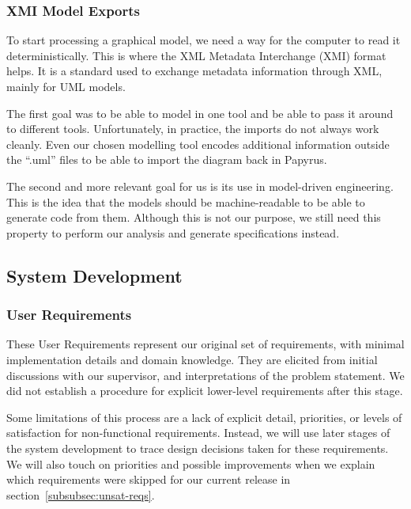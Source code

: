\subsubsection{XMI Model Exports}
To start processing a graphical model, we need a way for the computer to read it deterministically.
This is where the XML Metadata Interchange (XMI) format helps.
It is a standard used to exchange metadata information through XML, mainly for UML models.

The first goal was to be able to model in one tool and be able to pass it around to different tools.
Unfortunately, in practice, the imports do not always work cleanly.
Even our chosen modelling tool encodes additional information outside the ``.uml'' files to be able to import the diagram back in Papyrus.

The second and more relevant goal for us is its use in model-driven engineering.
This is the idea that the models should be machine-readable to be able to generate code from them.
Although this is not our purpose, we still need this property to perform our analysis and generate specifications instead.

\subsection{System Development}
\label{subsec:system-development}
\subsubsection{User Requirements}\label{subsubsec:user-reqs}

These User Requirements represent our original set of requirements, with minimal implementation details and domain knowledge.
They are elicited from initial discussions with our supervisor,
and interpretations of the problem statement.
We did not establish a procedure for explicit lower-level requirements after this stage.

Some limitations of this process are a lack of explicit detail, priorities, or levels of satisfaction for non-functional requirements.
Instead, we will use later stages of the system development to trace design decisions taken for these requirements.
We will also touch on priorities and possible improvements when we explain
which requirements were skipped for our current release in section~\ref{subsubsec:unsat-reqs}.

